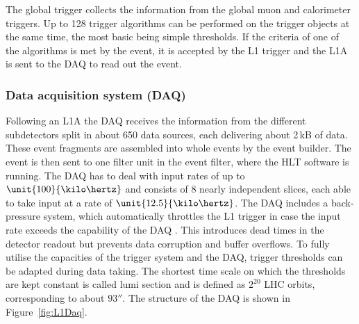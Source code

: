 The global trigger collects the information from the global muon and calorimeter triggers. Up to 128 trigger algorithms can be performed on the trigger objects at the same time, the most basic being simple \pt thresholds. If the criteria of one of the algorithms is met by the event, it is accepted by the L1 trigger and the L1A is sent to the DAQ to read out the event.  


\subsubsection*{Data acquisition system (DAQ)}
Following an L1A the DAQ receives the information from the different subdetectors split in about 650 data sources, each delivering about 2\,kB of data. These event fragments are assembled into whole events by the event builder. The event is then sent to one filter unit in the event filter, where the HLT software is running. The DAQ has to deal with input rates of up to $\unit{100}{\kilo\hertz}$ and consists of 8 nearly independent slices, each able to take input at a rate of $\unit{12.5}{\kilo\hertz}$. The DAQ includes a back-pressure system, which automatically throttles the L1 trigger in case the input rate exceeds the capability of the DAQ . This introduces dead times in the detector readout but prevents data corruption and buffer overflows. To fully utilise the capacities of the trigger system and the DAQ, trigger thresholds can be adapted during data taking. The shortest time scale on which the thresholds are kept constant is called lumi section and is defined as $2^{20}$ LHC orbits, corresponding to about $\unit{93}{\second}$. The structure of the DAQ is shown in Figure~\ref{fig:L1Daq}.
